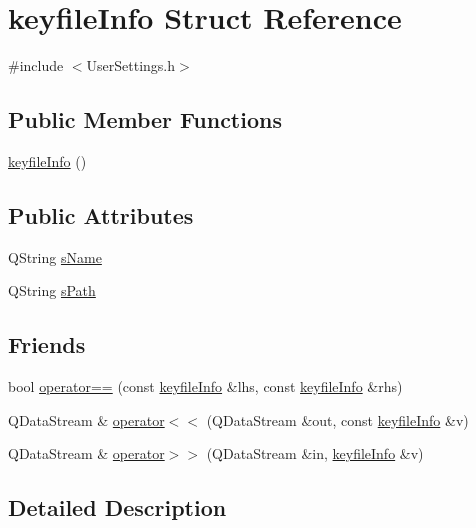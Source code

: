 \hypertarget{structkeyfile_info}{}\section{keyfile\+Info Struct Reference}
\label{structkeyfile_info}


{\ttfamily \#include $<$User\+Settings.\+h$>$}

\subsection*{Public Member Functions}
\begin{DoxyCompactItemize}
\item 
\hyperlink{structkeyfile_info_a5cdee0db7676a1605ef1b82524940bd4}{keyfile\+Info} ()
\end{DoxyCompactItemize}
\subsection*{Public Attributes}
\begin{DoxyCompactItemize}
\item 
Q\+String \hyperlink{structkeyfile_info_a137d6535d756973e69e88beae844ad97}{s\+Name}
\item 
Q\+String \hyperlink{structkeyfile_info_a7435f0bf3c05d8650640bf1f4264bb9d}{s\+Path}
\end{DoxyCompactItemize}
\subsection*{Friends}
\begin{DoxyCompactItemize}
\item 
bool \hyperlink{structkeyfile_info_a6de7a195a408aea8febd1f44f99cacda}{operator==} (const \hyperlink{structkeyfile_info}{keyfile\+Info} \&lhs, const \hyperlink{structkeyfile_info}{keyfile\+Info} \&rhs)
\item 
Q\+Data\+Stream \& \hyperlink{structkeyfile_info_ac716ea25b9d3f69ac023f0ddda6f8932}{operator$<$$<$} (Q\+Data\+Stream \&out, const \hyperlink{structkeyfile_info}{keyfile\+Info} \&v)
\item 
Q\+Data\+Stream \& \hyperlink{structkeyfile_info_addcf2b19a9de84f18aca5606598811f6}{operator$>$$>$} (Q\+Data\+Stream \&in, \hyperlink{structkeyfile_info}{keyfile\+Info} \&v)
\end{DoxyCompactItemize}


\subsection{Detailed Description}


